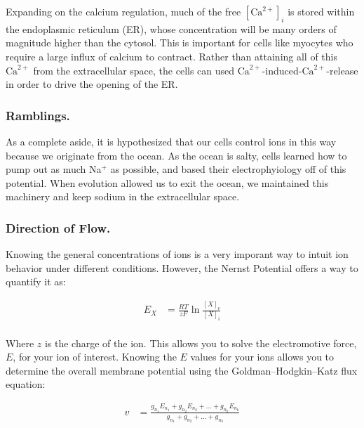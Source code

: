 \documentclass[12pt]{report}
\begin{document}
Expanding on the calcium regulation, much of the free $[\mathrm{Ca}^{2+}]_i$ is stored within the endoplasmic reticulum (ER), whose concentration will be many orders of magnitude higher than the cytosol. This is important for cells like myocytes who require a large influx of calcium to contract. Rather than attaining all of this $\mathrm{Ca}^{2+}$ from the extracellular space, the cells can used $\mathrm{Ca}^{2+}$-induced-$\mathrm{Ca}^{2+}$-release in order to drive the opening of the ER.\newline

\subsubsection{Ramblings.}

As a complete aside, it is hypothesized that our cells control ions in this way because we originate from the ocean. As the ocean is salty, cells learned how to pump out as much Na$^+$ as possible, and based their electrophyiology off of this potential. When evolution allowed us to exit the ocean, we maintained this machinery and keep sodium in the extracellular space. 

\subsubsection{Direction of Flow.}

Knowing the general concentrations of ions is a very imporant way to intuit ion behavior under different conditions. However, the Nernst Potential offers a way to quantify it as: 

\begin{equation} \label{Nernst1}
\begin{split}
E_X &= \frac{RT}{zF}\ln\frac{[X]_e}{[X]_i}\\
\end{split}
\end{equation}

Where $z$ is the charge of the ion. This allows you to solve the electromotive force, $E$, for your ion of interest. Knowing the $E$ values for your ions allows you to determine the overall membrane potential using the Goldman–Hodgkin–Katz flux equation:

\begin{equation} \label{GHK}
\begin{split}
v &= \frac{g_{n_1}E_{n_1} + g_{n_2}E_{n_2} + ... + g_{n_k}E_{n_k}}{g_{n_1} + g_{n_2} + ... + g_{n_k}}
\end{split}
\end{equation}
\end{document}
